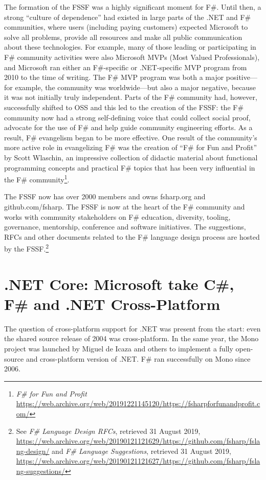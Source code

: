 \documentclass[acmsmall]{acmart}\settopmatter{}
\begin{document}
The formation of the FSSF was a highly significant moment for F\#.  Until then, a strong “culture of dependence” had existed in
large parts of the .NET and F\# communities, where users (including paying customers) expected Microsoft to solve all problems, provide all
resources and make all public communication about these technologies.  For example, many of those leading or participating
in F\# community activities were also Microsoft MVPs (Most Valued Professionals), and Microsoft ran either an F\#-specific or
.NET-specific MVP program from 2010 to the time of writing.  The F\# MVP program was both a major positive---for example, the
community was worldwide---but also a major negative, because it was not initially truly independent.
Parts of the F\# community had, however, successfully shifted to OSS and this led to the creation of the FSSF:
the F\# community now had a strong self-defining voice that could collect social proof, advocate for
the use of F\# and help guide community engineering efforts. As a result, F\# evangelism began to be more effective. One result of
the community’s more active role in evangelizing F\# was the creation of “F\# for Fun and Profit” by Scott Wlaschin, an impressive
collection of didactic material about functional programming concepts and practical F\# topics that has been very influential
in the F\# community\footnote{\textit{F\# for Fun and Profit} \url{https://web.archive.org/web/20191221145120/https://fsharpforfunandprofit.com/}}.


The FSSF now has over 2000 members and owns fsharp.org and github.com/fsharp. The FSSF is now at the heart of the F\# community
and works with community stakeholders on F\# education, diversity, tooling, governance, mentorship, conference and software
initiatives.  The suggestions, RFCs and other documents related to the F\# language design process are hosted by the
FSSF.\footnote{See \textit{F\# Language Design RFCs}, retrieved 31 August 2019, \url{https://web.archive.org/web/20190121121629/https://github.com/fsharp/fslang-design/} and \textit{F\# Language Suggestions}, retrieved 31 August 2019, \url{https://web.archive.org/web/20190121121627/https://github.com/fsharp/fslang-suggestions/}}

\section*{.NET Core: Microsoft take C\#, F\# and .NET Cross-Platform}

The question of cross-platform support for .NET was present from the start: even the shared source release of 2004 was
cross-platform.  In the same year, the Mono project was launched by Miguel de Icaza and others to implement a fully open-source and
cross-platform version of .NET. F\# ran successfully on Mono since 2006.  
\end{document}
